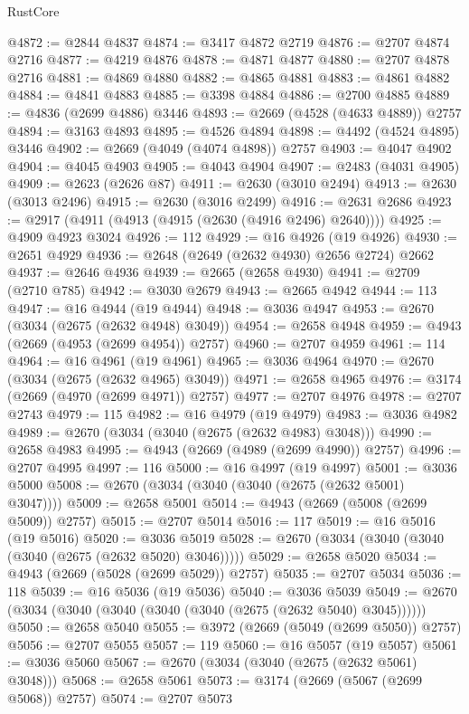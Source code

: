 \begin{lexlean}{RustCore}
\begin{coremodule}
@4872 := @2844 @4837
@4874 := @3417 @4872 @2719
@4876 := @2707 @4874 @2716
@4877 := @4219 @4876
@4878 := @4871 @4877
@4880 := @2707 @4878 @2716
@4881 := @4869 @4880
@4882 := @4865 @4881
@4883 := @4861 @4882
@4884 := @4841 @4883
@4885 := @3398 @4884
@4886 := @2700 @4885
@4889 := @4836 (@2699 @4886) @3446
@4893 := @2669 (@4528 (@4633 @4889)) @2757
@4894 := @3163 @4893
@4895 := @4526 @4894
@4898 := @4492 (@4524 @4895) @3446
@4902 := @2669 (@4049 (@4074 @4898)) @2757
@4903 := @4047 @4902
@4904 := @4045 @4903
@4905 := @4043 @4904
@4907 := @2483 (@4031 @4905)
@4909 := @2623 (@2626 @87)
@4911 := @2630 (@3010 @2494)
@4913 := @2630 (@3013 @2496)
@4915 := @2630 (@3016 @2499)
@4916 := @2631 @2686
@4923 := @2917 (@4911 (@4913 (@4915 (@2630 (@4916 @2496) @2640))))
@4925 := @4909 @4923 @3024
@4926 := 112
@4929 := @16 @4926 (@19 @4926)
@4930 := @2651 @4929
@4936 := @2648 (@2649 (@2632 @4930) @2656 @2724) @2662
@4937 := @2646 @4936
@4939 := @2665 (@2658 @4930)
@4941 := @2709 (@2710 @785)
@4942 := @3030 @2679
@4943 := @2665 @4942
@4944 := 113
@4947 := @16 @4944 (@19 @4944)
@4948 := @3036 @4947
@4953 := @2670 (@3034 (@2675 (@2632 @4948) @3049))
@4954 := @2658 @4948
@4959 := @4943 (@2669 (@4953 (@2699 @4954)) @2757)
@4960 := @2707 @4959
@4961 := 114
@4964 := @16 @4961 (@19 @4961)
@4965 := @3036 @4964
@4970 := @2670 (@3034 (@2675 (@2632 @4965) @3049))
@4971 := @2658 @4965
@4976 := @3174 (@2669 (@4970 (@2699 @4971)) @2757)
@4977 := @2707 @4976
@4978 := @2707 @2743
@4979 := 115
@4982 := @16 @4979 (@19 @4979)
@4983 := @3036 @4982
@4989 := @2670 (@3034 (@3040 (@2675 (@2632 @4983) @3048)))
@4990 := @2658 @4983
@4995 := @4943 (@2669 (@4989 (@2699 @4990)) @2757)
@4996 := @2707 @4995
@4997 := 116
@5000 := @16 @4997 (@19 @4997)
@5001 := @3036 @5000
@5008 := @2670 (@3034 (@3040 (@3040 (@2675 (@2632 @5001) @3047))))
@5009 := @2658 @5001
@5014 := @4943 (@2669 (@5008 (@2699 @5009)) @2757)
@5015 := @2707 @5014
@5016 := 117
@5019 := @16 @5016 (@19 @5016)
@5020 := @3036 @5019
@5028 := @2670 (@3034 (@3040 (@3040 (@3040 (@2675 (@2632 @5020) @3046)))))
@5029 := @2658 @5020
@5034 := @4943 (@2669 (@5028 (@2699 @5029)) @2757)
@5035 := @2707 @5034
@5036 := 118
@5039 := @16 @5036 (@19 @5036)
@5040 := @3036 @5039
@5049 := @2670 (@3034 (@3040 (@3040 (@3040 (@3040 (@2675 (@2632 @5040) @3045))))))
@5050 := @2658 @5040
@5055 := @3972 (@2669 (@5049 (@2699 @5050)) @2757)
@5056 := @2707 @5055
@5057 := 119
@5060 := @16 @5057 (@19 @5057)
@5061 := @3036 @5060
@5067 := @2670 (@3034 (@3040 (@2675 (@2632 @5061) @3048)))
@5068 := @2658 @5061
@5073 := @3174 (@2669 (@5067 (@2699 @5068)) @2757)
@5074 := @2707 @5073

\end{coremodule}
\end{lexlean}
